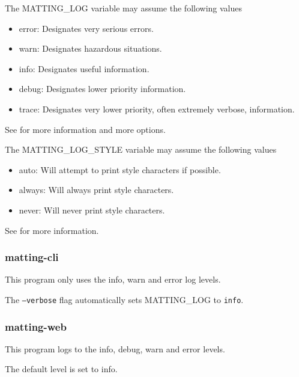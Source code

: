 \documentclass[a4paper]{article}
\begin{document}
The \colorbox{gray!10}{MATTING\_LOG} variable may assume the following values
\begin{itemize}
    \item \colorbox{gray!10}{error}: Designates very serious errors.
    \item \colorbox{gray!10}{warn}: Designates hazardous situations.
    \item \colorbox{gray!10}{info}: Designates useful information.
    \item \colorbox{gray!10}{debug}: Designates lower priority information.
    \item \colorbox{gray!10}{trace}: Designates very lower priority, often extremely verbose, information.
\end{itemize}
See \cite{envlogginglvl} for more information and more options.

The \colorbox{gray!10}{MATTING\_LOG\_STYLE} variable may assume the following values
\begin{itemize}
    \item \colorbox{gray!10}{auto}: Will attempt to print style characters if possible.
    \item \colorbox{gray!10}{always}: Will always print style characters.
    \item \colorbox{gray!10}{never}: Will never print style characters.
\end{itemize}
See \cite{envloggingstyle} for more information.

\subsubsection{matting-cli}

This program only uses the \colorbox{gray!10}{info}, \colorbox{gray!10}{warn}
and \colorbox{gray!10}{error} log levels.

The \texttt{--verbose} flag automatically sets \colorbox{gray!10}{MATTING\_LOG}
to \colorbox{gray!10}{\texttt{info}}. \\

\subsubsection{matting-web}

This program logs to the \colorbox{gray!10}{info},
\colorbox{gray!10}{debug},
\colorbox{gray!10}{warn}
and \colorbox{gray!10}{error} levels.

The default level is set to \colorbox{gray!10}{info}.
\end{document}
